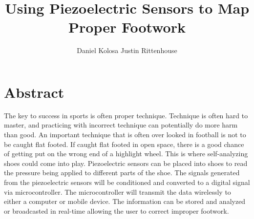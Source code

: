 \documentclass[12pt,a4paper]{report}
\author{Daniel Kolosa Justin Rittenhouse}
\title{Using Piezoelectric Sensors to Map Proper Footwork}
\begin{document}
\maketitle
\section*{Abstract}
The key to success in sports is often proper technique. Technique is often hard to master, and practicing with incorrect technique can potentially do more harm than good. An important technique that is often over looked in football is not to be caught flat footed. If caught flat footed in open space, there is a good chance of getting put on the wrong end of a highlight wheel. This is where self-analyzing shoes could come into play. Piezoelectric sensors can be placed into shoes to read the pressure being applied to different parts of the shoe. The signals generated from the piezoelectric sensors will be conditioned and converted to a digital signal via microcontroller. The microcontroller will transmit the data wirelessly to either a computer or mobile device. The information can be stored and analyzed or broadcasted in real-time allowing the user to correct improper footwork.
\end{document}
